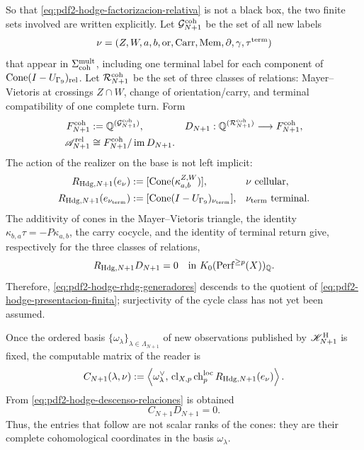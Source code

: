 So that \eqref{eq:pdf2-hodge-factorizacion-relativa} is not a black box,
the two finite sets involved are written explicitly. Let
\(\mathcal G_{N+1}^{\rm coh}\) be the set of all new labels
\[
 \nu=(Z,W,a,b,\operatorname{or},\operatorname{Carr},
       \operatorname{Mem},\partial,\gamma,\tau^{\rm term})
\]
that appear in \(\Sigma_{\rm coh}^{\rm mult}\), including one terminal
label for each component of
\(\operatorname{Cone}(I-U_{\Gamma_9})_{\rm rel}\). Let
\(\mathcal R_{N+1}^{\rm coh}\) be the set of three classes of relations:
Mayer--Vietoris at crossings \(Z\cap W\), change of orientation/carry, and
terminal compatibility of one complete turn. Form
\begin{equation}\label{eq:pdf2-hodge-presentacion-finita}
\begin{aligned}
 F_{N+1}^{\rm coh}&:=\mathbb Q^{(\mathcal G_{N+1}^{\rm coh})},&
 D_{N+1}&:\mathbb Q^{(\mathcal R_{N+1}^{\rm coh})}
             \longrightarrow F_{N+1}^{\rm coh},\\
 \mathscr A_{N+1}^{\rm rel}
   &\cong F_{N+1}^{\rm coh}/\operatorname{im}D_{N+1}.&&
\end{aligned}
\end{equation}
The action of the realizer on the base is not left implicit:
\begin{equation}\label{eq:pdf2-hodge-rhdg-generadores}
\begin{aligned}
 R_{{\rm Hdg},N+1}(e_\nu)
   &:=[\operatorname{Cone}(\kappa_{a,b}^{Z,W})],
       &&\nu\ \text{cellular},\\
 R_{{\rm Hdg},N+1}(e_{\nu_{\rm term}})
   &:=[\operatorname{Cone}(I-U_{\Gamma_9})_{\nu_{\rm term}}],
       &&\nu_{\rm term}\ \text{terminal}.
\end{aligned}
\end{equation}
The additivity of cones in the Mayer--Vietoris triangle, the identity
\(\kappa_{b,a}\tau=-P\kappa_{a,b}\), the carry cocycle, and the identity of
terminal return give, respectively for the three classes of relations,
\begin{equation}\label{eq:pdf2-hodge-descenso-relaciones}
 R_{{\rm Hdg},N+1}D_{N+1}=0
 \quad\text{in }K_0(\operatorname{Perf}^{\ge p}(X))_{\mathbb Q}.
\end{equation}
Therefore, \eqref{eq:pdf2-hodge-rhdg-generadores} descends to the quotient of
\eqref{eq:pdf2-hodge-presentacion-finita}; surjectivity of the cycle class has not yet
been assumed.

Once the ordered basis
\(\{\omega_\lambda\}_{\lambda\in\Lambda_{N+1}}\) of new observations
published by \(\mathscr K^{\rm H}_{N+1}\) is fixed, the computable matrix of the reader is
\begin{equation}\label{eq:pdf2-hodge-matriz-lector}
 C_{N+1}(\lambda,\nu):=
 \left\langle\omega_\lambda^\vee,\,
 \operatorname{cl}_{X,p}\operatorname{ch}^{\rm loc}_p
 R_{{\rm Hdg},N+1}(e_\nu)\right\rangle .
\end{equation}
From \eqref{eq:pdf2-hodge-descenso-relaciones} is obtained
\begin{equation}\label{eq:pdf2-hodge-cd-cero}
 C_{N+1}D_{N+1}=0.
\end{equation}
Thus, the entries that follow are not scalar ranks of the cones: they are their
complete cohomological coordinates in the basis \(\omega_\lambda\).

